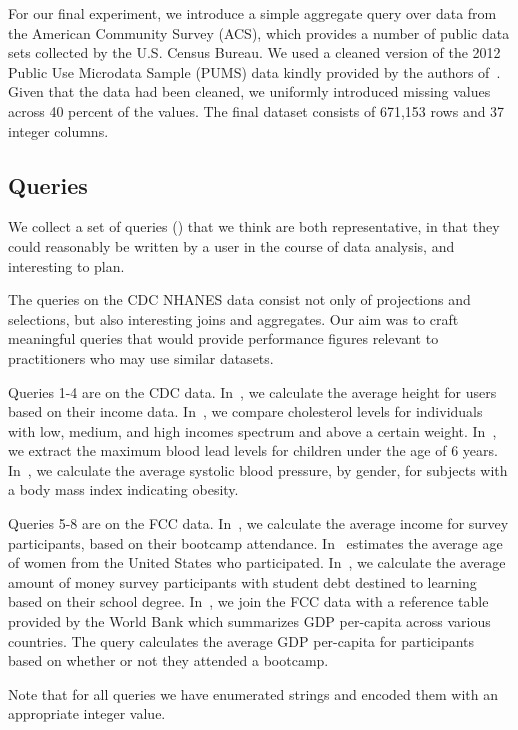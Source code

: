 For our final experiment, we introduce a simple aggregate query over data from the American Community Survey (ACS), which
provides a number of public data sets collected by the U.S. Census Bureau.
We used a cleaned version of the 2012 Public Use Microdata Sample (PUMS) data kindly provided by the authors of~\cite{akande2015empirical}.
Given that the data had been cleaned, we uniformly introduced missing values across 40 percent of the values. The final dataset consists
of 671,153 rows and 37 integer columns.

\subsection{Queries}
We collect a set of queries () that we think are both representative,
in that they could reasonably be written by a user in the course of data analysis, and
interesting to plan.

The queries on the CDC NHANES data consist not only of projections and selections,
but also interesting joins and aggregates. Our aim was to craft meaningful queries
that would provide performance figures relevant to practitioners who may use
similar datasets.

Queries 1-4 are on the CDC data. In~, we calculate the average height for
users based on their income data. In~, we compare cholesterol levels for
individuals with low, medium, and high incomes spectrum and above a certain weight. In~, 
we extract the maximum blood lead levels for children under the age of 6
years. In~, we calculate the average systolic blood pressure, by gender, for
subjects with a body mass index indicating obesity. 

Queries 5-8 are on the FCC data. In~, we calculate the average income for
survey participants, based on their bootcamp attendance. In~ estimates the
average age of women from the United States who participated. In~, we
calculate the average amount of money survey participants with student debt destined to
learning based on their school degree. In~, we join the FCC data with a
reference table provided by the World Bank which summarizes GDP per-capita across various
countries\cite{worldbank-data}. The query calculates the average GDP per-capita for
participants based on whether or not they attended a bootcamp. 

Note that for all queries we have enumerated strings and encoded them with
an appropriate integer value.

